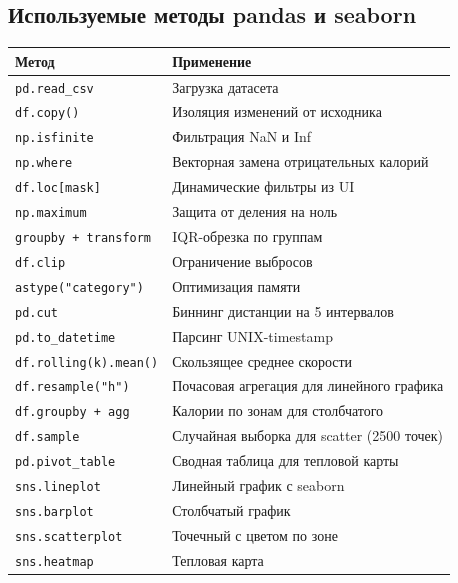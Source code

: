 \documentclass[oneside,a4paper,14pt]{extarticle}
\begin{document}
\normalsize
\newpage
\begin{flushleft}
\section*{Используемые методы pandas и seaborn}

\begin{center}
\begin{tabular}{|l|l|}
\hline
\textbf{Метод} & \textbf{Применение} \\
\hline
\texttt{pd.read\_csv} & Загрузка датасета \\
\texttt{df.copy()} & Изоляция изменений от исходника \\
\texttt{np.isfinite} & Фильтрация NaN и Inf \\
\texttt{np.where} & Векторная замена отрицательных калорий \\
\texttt{df.loc[mask]} & Динамические фильтры из UI \\
\texttt{np.maximum} & Защита от деления на ноль \\
\texttt{groupby + transform} & IQR-обрезка по группам \\
\texttt{df.clip} & Ограничение выбросов \\
\texttt{astype("category")} & Оптимизация памяти \\
\texttt{pd.cut} & Биннинг дистанции на 5 интервалов \\
\texttt{pd.to\_datetime} & Парсинг UNIX-timestamp \\
\texttt{df.rolling(k).mean()} & Скользящее среднее скорости \\
\texttt{df.resample("h")} & Почасовая агрегация для линейного графика \\
\texttt{df.groupby + agg} & Калории по зонам для столбчатого \\
\texttt{df.sample} & Случайная выборка для scatter (2500 точек) \\
\texttt{pd.pivot\_table} & Сводная таблица для тепловой карты \\
\texttt{sns.lineplot} & Линейный график с seaborn \\
\texttt{sns.barplot} & Столбчатый график \\
\texttt{sns.scatterplot} & Точечный с цветом по зоне \\
\texttt{sns.heatmap} & Тепловая карта \\
\hline
\end{tabular}
\end{center}
\end{flushleft}
\end{document}
